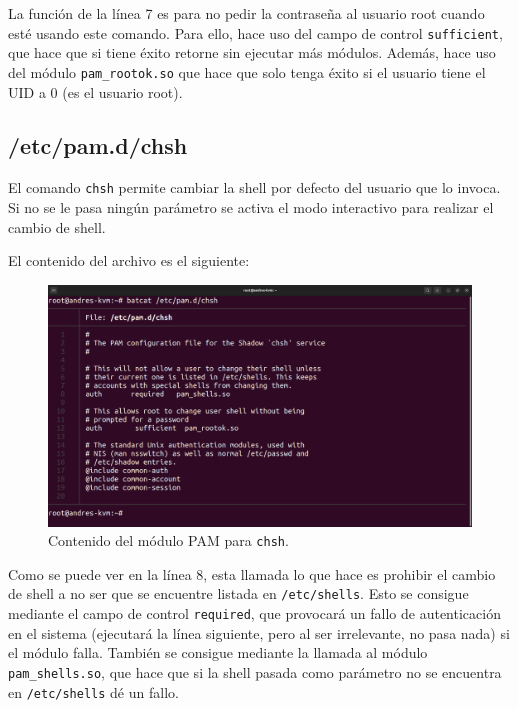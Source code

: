 \documentclass{article}
\begin{document}
La función de la línea 7 es para no pedir la contraseña al usuario root cuando esté usando este comando. Para ello, hace uso del campo de control \verb|sufficient|, que hace que si tiene éxito retorne sin ejecutar más módulos. Además, hace uso del módulo \verb|pam_rootok.so| que hace que solo tenga éxito si el usuario tiene el UID a 0 (es el usuario root).

\newpage

\subsection{/etc/pam.d/chsh}
El comando \verb|chsh| permite cambiar la shell por defecto del usuario que lo invoca. Si no se le pasa ningún parámetro se activa el modo interactivo para realizar el cambio de shell.

\bigskip

El contenido del archivo es el siguiente:

\begin{figure}[H]
    \includegraphics[width=\textwidth]{imagenes/pamchsh.png}
    \caption{Contenido del módulo PAM para \texttt{chsh}.}
\end{figure}


Como se puede ver en la línea 8, esta llamada lo que hace es prohibir el cambio de shell a no ser que se encuentre listada en \verb|/etc/shells|. Esto se consigue mediante el campo de control \verb|required|, que provocará un fallo de autenticación en el sistema (ejecutará la línea siguiente, pero al ser irrelevante, no pasa nada) si el módulo falla. También se consigue mediante la llamada al módulo \verb|pam_shells.so|, que hace que si la shell pasada como parámetro no se encuentra en \verb|/etc/shells| dé un fallo.

\bigskip
\end{document}
